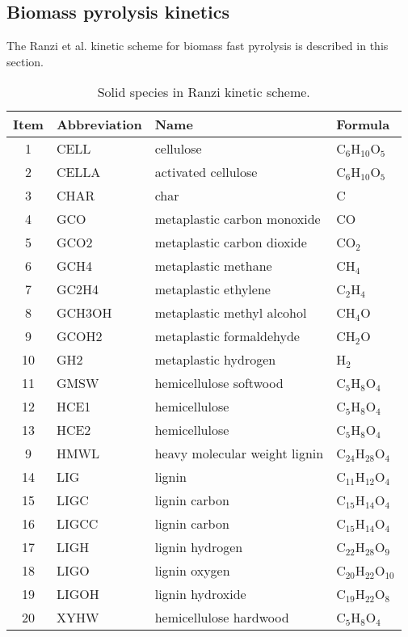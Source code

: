 \subsection{Biomass pyrolysis kinetics}

The Ranzi et al. kinetic scheme for biomass fast pyrolysis is described in this section.

\begin{table}[H]
    \centering
    \caption{Solid species in Ranzi kinetic scheme.}
    \begin{tabular}{@{}clll@{}}
        \toprule
        Item & Abbreviation & Name & Formula \\
        \midrule
        1   & CELL      & cellulose                     & C$_6$H$_{10}$O$_5$ \\
        2   & CELLA     & activated cellulose           & C$_6$H$_{10}$O$_5$ \\
        3   & CHAR      & char                          & C \\
        4   & GCO       & metaplastic carbon monoxide   & CO \\
        5   & GCO2      & metaplastic carbon dioxide    & CO$_2$ \\
        6   & GCH4      & metaplastic methane           & CH$_4$ \\
        7   & GC2H4     & metaplastic ethylene          & C$_2$H$_4$ \\
        8   & GCH3OH    & metaplastic methyl alcohol    & CH$_4$O \\
        9   & GCOH2     & metaplastic formaldehyde      & CH$_2$O \\
        10  & GH2       & metaplastic hydrogen          & H$_2$ \\
        11  & GMSW      & hemicellulose softwood        & C$_5$H$_8$O$_4$ \\
        12  & HCE1      & hemicellulose                 & C$_5$H$_8$O$_4$ \\
        13  & HCE2      & hemicellulose                 & C$_5$H$_8$O$_4$ \\
        9   & HMWL      & heavy molecular weight lignin & C$_{24}$H$_{28}$O$_4$ \\
        14  & LIG       & lignin                        & C$_{11}$H$_{12}$O$_4$ \\
        15  & LIGC      & lignin carbon                 & C$_{15}$H$_{14}$O$_4$ \\
        16  & LIGCC     & lignin carbon                 & C$_{15}$H$_{14}$O$_4$ \\
        17  & LIGH      & lignin hydrogen               & C$_{22}$H$_{28}$O$_9$ \\
        18  & LIGO      & lignin oxygen                 & C$_{20}$H$_{22}$O$_{10}$ \\
        19  & LIGOH     & lignin hydroxide              & C$_{19}$H$_{22}$O$_8$ \\
        20  & XYHW      & hemicellulose hardwood        & C$_5$H$_8$O$_4$ \\
        \bottomrule
    \end{tabular}
\end{table}

